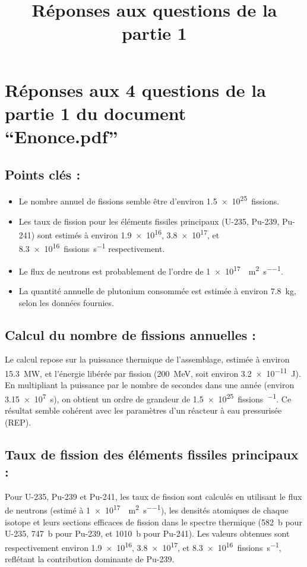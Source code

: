 \documentclass[12pt,a4paper]{article}
\title{Réponses aux questions de la partie 1}
\author{}
\date{}
\begin{document}
\maketitle

\section*{Réponses aux 4 questions de la partie 1 du document ``Enonce.pdf''}

\subsection*{Points clés :}
\begin{itemize}
  \item Le nombre annuel de fissions semble être d'environ \SI{1,5e25}{fissions}.
  \item Les taux de fission pour les éléments fissiles principaux (U-235, Pu-239, Pu-241) sont estimés à environ \SI{1,9e16}{}, \SI{3,8e17}{}, et \SI{8,3e16}{fissions\per\second} respectivement.
  \item Le flux de neutrons est probablement de l'ordre de \SI{1e17}{\neutron\per\meter\squared\per\second}.
  \item La quantité annuelle de plutonium consommée est estimée à environ \SI{7,8}{\kilogram}, selon les données fournies.
\end{itemize}

\subsection*{Calcul du nombre de fissions annuelles :}
Le calcul repose sur la puissance thermique de l'assemblage, estimée à environ \SI{15,3}{\mega\watt}, et l'énergie libérée par fission (\SI{200}{\mega\electronvolt}, soit environ \SI{3,2e-11}{\joule}). En multipliant la puissance par le nombre de secondes dans une année (environ \SI{3,15e7}{\second}), on obtient un ordre de grandeur de \SI{1,5e25}{fissions\per\year}. Ce résultat semble cohérent avec les paramètres d'un réacteur à eau pressurisée (REP).

\subsection*{Taux de fission des éléments fissiles principaux :}
Pour U-235, Pu-239 et Pu-241, les taux de fission sont calculés en utilisant le flux de neutrons (estimé à \SI{1e17}{\neutron\per\meter\squared\per\second}), les densités atomiques de chaque isotope et leurs sections efficaces de fission dans le spectre thermique (\SI{582}{\barn} pour U-235, \SI{747}{\barn} pour Pu-239, et \SI{1010}{\barn} pour Pu-241). Les valeurs obtenues sont respectivement environ \SI{1,9e16}{}, \SI{3,8e17}{}, et \SI{8,3e16}{fissions\per\second}, reflétant la contribution dominante de Pu-239.
\end{document}
